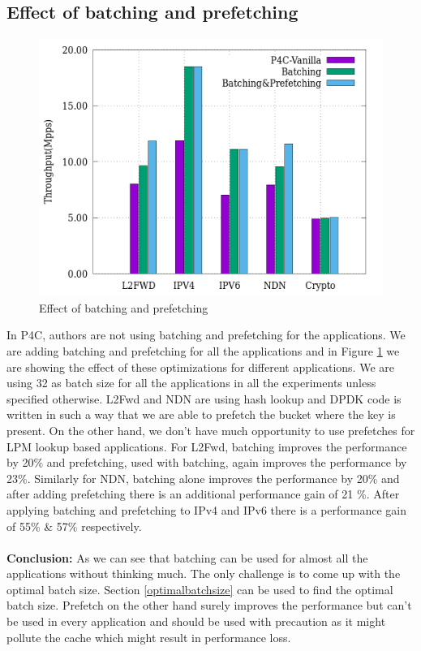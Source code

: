 \subsection{Effect of batching and prefetching}
\label{batchingandprefetching}
\begin{figure}[ht]
\includegraphics[width = \linewidth]{Figures/effectofbatching.png}
\caption{Effect of batching and prefetching}
\label{batchingandprefetchingfigure}
\end{figure}
In P4C\cite{Laki:2016:HSP:2934872.2959080}, authors are not using batching and prefetching for the applications. We are adding batching and prefetching for all the applications and in Figure \ref{batchingandprefetchingfigure} we are showing the effect of these optimizations for different applications. We are using 32 as batch size for all the applications in all the experiments unless specified otherwise. L2Fwd and NDN are using hash lookup and DPDK code is written in such a way that we are able to prefetch the bucket where the key is present. On the other hand, we don't have much opportunity to use prefetches for LPM lookup based applications. For L2Fwd, batching improves the performance by 20\% and prefetching, used with batching, again improves the performance by 23\%. Similarly for NDN, batching alone improves the performance by 20\% and after adding prefetching there is an additional performance gain of 21 \%. After applying batching and prefetching to IPv4 and IPv6 there is a performance gain of 55\% \& 57\% respectively.
\\
\\
\textbf{Conclusion:} As we can see that batching can be used for almost all the applications without thinking much. The only challenge is to come up with the optimal batch size. Section \ref{optimalbatchsize} can be used to find the optimal batch size. Prefetch on the other hand surely improves the performance but can't be used in every application and should be used with precaution as it might pollute the cache which might result in performance loss.

